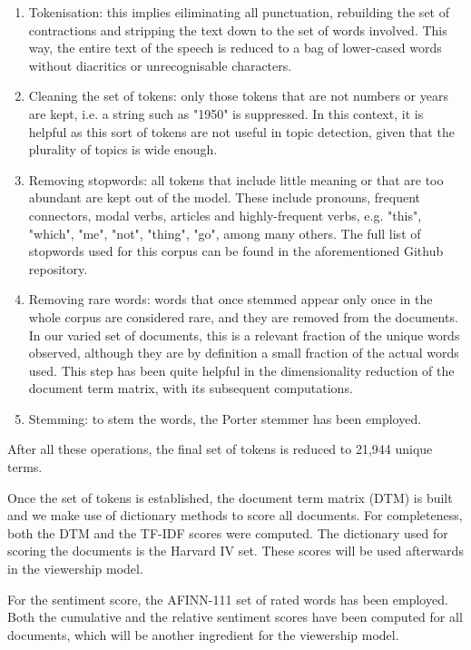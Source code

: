 \documentclass[a4paper, 11pt]{article} %
\begin{document}
\begin{enumerate}
\item Tokenisation: this implies eiliminating all punctuation, rebuilding the set of contractions and stripping the text down to the set of words involved. This way, the entire text of the speech is reduced to a bag of lower-cased words without diacritics or unrecognisable characters.
\item Cleaning the set of tokens: only those tokens that are not numbers or years are kept, i.e. a string such as "1950" is suppressed. In this context, it is helpful as this sort of tokens are not useful in topic detection, given that the plurality of topics is wide enough.
\item Removing stopwords: all tokens that include little meaning or that are too abundant are kept out of the model. These include pronouns, frequent connectors, modal verbs, articles and highly-frequent verbs, e.g. "this", "which", "me", "not", "thing", "go", among many others. The full list of stopwords used for this corpus can be found in the aforementioned Github repository.
\item Removing rare words: words that once stemmed appear only once in the whole corpus are considered rare, and they are removed from the documents. In our varied set of documents, this is a relevant fraction of the unique words observed, although they are by definition a small fraction of the actual words used. This step has been quite helpful in the dimensionality reduction of the document term matrix, with its subsequent computations.
\item Stemming: to stem the words, the Porter stemmer has been employed.
\end{enumerate}

After all these operations, the final set of tokens is reduced to 21,944 unique terms.

Once the set of tokens is established, the document term matrix (DTM) is built and we make use of dictionary methods to score all documents. For completeness, both the DTM and the TF-IDF scores were computed. The dictionary used for scoring the documents is the Harvard IV set. These scores will be used afterwards in the viewership model.

For the sentiment score, the AFINN-111 set of rated words has been employed. Both the cumulative and the relative sentiment scores have been computed for all documents, which will be another ingredient for the viewership model.
\end{document}
